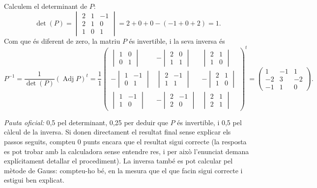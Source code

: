 \begin{apartats}
\begin{solucio}
Calculem el determinant de $P$:
\[
\det(P)=\begin{vmatrix}2&1&-1\\2&1&0\\1&0&1\end{vmatrix}=2+0+0-(-1+0+2)=1 .
\]
Com que és diferent de zero, la matriu $P$ és invertible, i la seva inversa és
\[
P^{-1}=\frac{1}{\det(P)}\left(\operatorname{Adj}P\right)^t=\frac11
\begin{pmatrix}
\begin{vmatrix}1&0\\0&1\end{vmatrix}&-\begin{vmatrix}2&0\\1&1\end{vmatrix}&\begin{vmatrix}2&1\\1&0\end{vmatrix}\\[8pt]
-\begin{vmatrix}1&-1\\0&1\end{vmatrix}&\begin{vmatrix}2&-1\\1&1\end{vmatrix}&-\begin{vmatrix}2&1\\1&0\end{vmatrix}\\[8pt]
\begin{vmatrix}1&-1\\1&0\end{vmatrix}&-\begin{vmatrix}2&-1\\2&0\end{vmatrix}&\begin{vmatrix}2&1\\2&1\end{vmatrix}
\end{pmatrix}^{\!t}
=\begin{pmatrix}1&-1&1\\-2&3&-2\\-1&1&0\end{pmatrix}.
\]

\textit{Pauta oficial:} 0,5 pel determinant, 0,25 per deduir que $P$ és invertible, i 0,5 pel càlcul de la
inversa. Si donen directament el resultat final sense explicar els passos seguits, compteu 0 punts encara que el
resultat sigui correcte (la resposta es pot trobar amb la calculadora sense entendre res, i per això l'enunciat
demana explícitament detallar el procediment). La inversa també es pot calcular pel mètode de Gauss: compteu-ho
bé, en la mesura que el que facin sigui correcte i estigui ben explicat.
\end{solucio}


\end{apartats}

